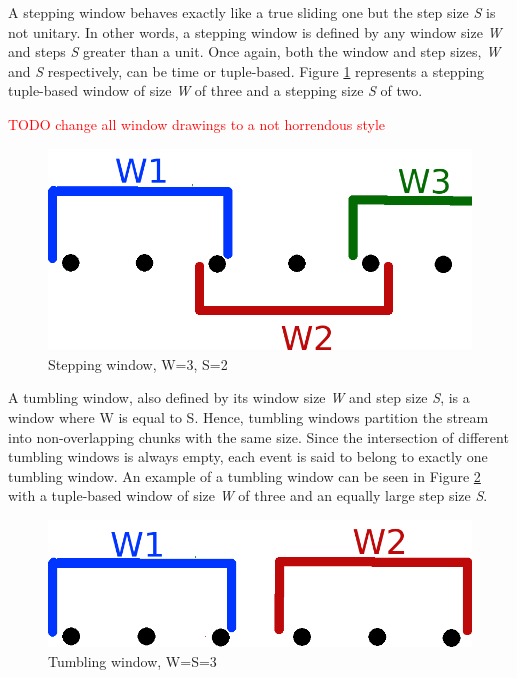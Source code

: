 A stepping window behaves exactly like a true sliding one but the step size \textit{S} is not unitary. In other words, a stepping window is defined by any window size \textit{W} and steps \textit{S} greater than a unit. Once again, both the window and step sizes, \textit{W} and \textit{S} respectively, can be time or tuple-based. Figure \ref{fig:stepping-window} represents a stepping tuple-based window of size \textit{W} of three and a stepping size \textit{S} of two.

\textcolor{red}{TODO change all window drawings to a not horrendous style}

\begin{figure}[!htb]
    \begin{center}
      \includegraphics[scale=0.3]{figures/stepping.png}
      \caption[Stepping window]{Stepping window, W=3, S=2}
      \label{fig:stepping-window}
    \end{center}
\end{figure}

A tumbling window, also defined by its window size \textit{W} and step size \textit{S}, is a window where W is equal to S. Hence, tumbling windows partition the stream into non-overlapping chunks with the same size. Since the intersection of different tumbling windows is always empty, each event is said to belong to exactly one tumbling window. An example of a tumbling window can be seen in Figure \ref{fig:tumbling-window} with a tuple-based window of size \textit{W} of three and an equally large step size \textit{S}.

\begin{figure}[!htb]
    \begin{center}
      \includegraphics[scale=0.3]{figures/tumbling.png}
      \caption[Tumbling window]{Tumbling window, W=S=3}
      \label{fig:tumbling-window}
    \end{center}
\end{figure}

